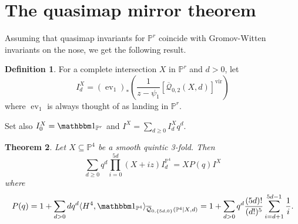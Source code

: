 \documentclass[11pt]{amsart}
\newcommand{\Q}[4]{\overline{\mathcal Q}_{#1,#2}(#3,#4)}
\newcommand{\PP}{\mathbb P}
\newcommand{\ev}{\operatorname{ev}}
\theoremstyle{plain}
\newtheorem{thm}{Theorem}[section]
\theoremstyle{definition}
\newtheorem{dfn}[thm]{Definition}
\begin{document}
\section{The quasimap mirror theorem}
Assuming that quasimap invariants for $\PP^r$ coincide with Gromov-Witten invariants on the nose, we get the following result.
\begin{dfn}
 For a complete intersection $X$ in $\PP^r$ and $d>0$, let
 \[
  I^X_d=(\ev_1)_*\left(\frac{1}{z-\psi_1}[\Q{0}{2}{X}{d}]^\text{vir}\right)
 \]
 where $\ev_1$ is always thought of as landing in $\PP^r$.
 
 Set also $I^X_0=\mathbbm 1_{\PP^r}$ and $I^X=\sum_{d\geq 0}I^X_d q^d$.
\end{dfn}
\begin{thm}
Let $X\subseteq\PP^4$ be a smooth quintic 3-fold. Then
 \[
  \sum_{d\geq 0} q^d\prod_{i=0}^{5d}(X+iz)I^{\PP^4}_d= XP(q)I^X
 \]
where
\[
 P(q)=1+\sum_{d>0}dq^d\langle H^4,\mathbbm 1_{\PP^4}\rangle_{\Q{0}{\{5d,0\}}{\PP^4|X}{d}}=1+\sum_{d>0}q^d\frac{(5d)!}{(d!)^5}\sum_{i=d+1}^{5d-1}\frac{1}{i}.
\]
\end{thm}
\end{document}
